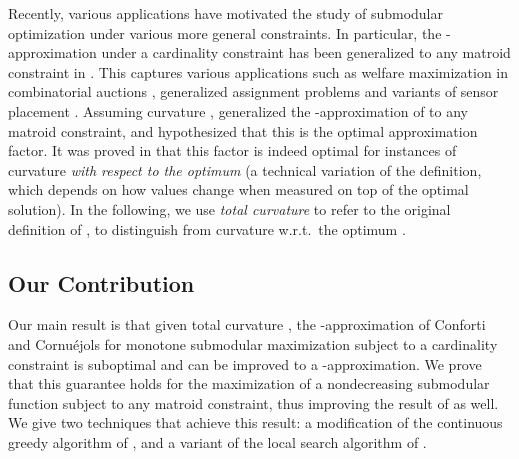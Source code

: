\documentclass{article}
\theoremstyle{definition}
\begin{document}
Recently, various applications have motivated the study of submodular optimization under various more general constraints. In particular, the -approximation under a cardinality constraint has been generalized to any matroid constraint in \cite{Calinescu2011}. This captures various applications such as welfare maximization in combinatorial auctions \cite{Vondrak2008}, generalized assignment problems \cite{Calinescu2007} and variants of sensor placement \cite{KRGG09}. Assuming curvature , \cite{Vondrak2010} generalized the -approximation of \cite{Conforti1984} to any matroid constraint, and hypothesized that this is the optimal approximation factor. It was proved in \cite{Vondrak2010} that this factor is indeed optimal for instances of curvature  {\em with respect to the optimum} (a technical variation of the definition, which depends on how values change when measured on top of the optimal solution). 
In the following, we use {\em total curvature} to refer to the original definition of \cite{Conforti1984}, to distinguish from curvature w.r.t.~the optimum \cite{Vondrak2010}.

\subsection{Our Contribution}
\label{sec:our-contribution}

Our main result is that given total curvature , the -approximation of Conforti and Cornu\'ejols for monotone submodular maximization subject to a cardinality constraint \cite{Conforti1984} is suboptimal and can be improved to a -approximation. We prove that this guarantee holds for the maximization of a nondecreasing submodular function subject to any matroid constraint, thus improving the result of \cite{Vondrak2010} as well. We give two techniques that achieve this result: a modification of the continuous greedy algorithm of \cite{Calinescu2011}, and a variant of the local search algorithm of \cite{Filmus2014}. 
\end{document}
